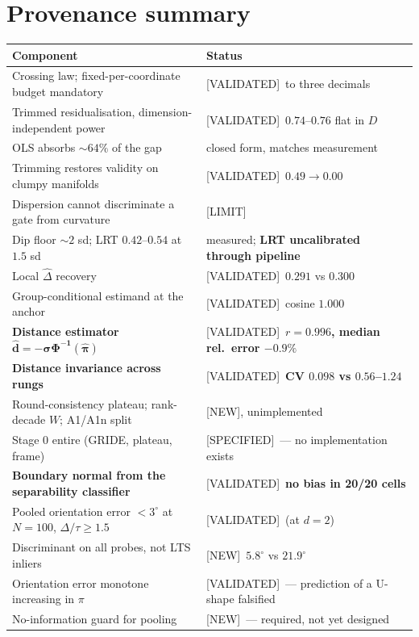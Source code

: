 \documentclass[11pt]{article}
\newcommand{\dhat}{\hat{d}}
\newcommand{\pihat}{\hat{\pi}}
\newcommand{\Dhat}{\hat{\Delta}}
\newcommand{\provtag}[2]{{\footnotesize\sffamily\textcolor{#1}{[#2]}}}
\newcommand{\VALID}{\provtag{okgreen}{VALIDATED}}
\newcommand{\SPEC}{\provtag{specblue}{SPECIFIED}}
\newcommand{\NEWT}{\provtag{newmag}{NEW}}
\newcommand{\LIMIT}{\provtag{limred}{LIMIT}}
\begin{document}
\section{Provenance summary}
\label{sec:provenance}

\begin{table}[h]
\small
\begin{tabular}{@{}p{}p{}@{}}
\toprule
\textbf{\sffamily Component} & \textbf{\sffamily Status}\\
\midrule
Crossing law; fixed-per-coordinate budget mandatory & \VALID\ to three decimals\\
Trimmed residualisation, dimension-independent power & \VALID\ $0.74$--$0.76$ flat in $D$\\
OLS absorbs ${\sim}64\%$ of the gap & closed form, matches measurement\\
Trimming restores validity on clumpy manifolds & \VALID\ $0.49 \to 0.00$\\
Dispersion cannot discriminate a gate from curvature & \LIMIT\\
Dip floor ${\sim}2$ sd; LRT $0.42$--$0.54$ at $1.5$ sd
  & measured; \textbf{LRT uncalibrated through pipeline}\\
Local $\Dhat$ recovery & \VALID\ $0.291$ vs $0.300$\\
Group-conditional estimand at the anchor & \VALID\ cosine $1.000$\\
\textbf{Distance estimator} $\bm{\dhat = -\sigma\Phi^{-1}(\pihat)}$
  & \VALID\ \textbf{$r = 0.996$, median rel.\ error $-0.9\%$}\\
\textbf{Distance invariance across rungs} & \VALID\ \textbf{CV $0.098$ vs $0.56$--$1.24$}\\
Round-consistency plateau; rank-decade $W$; A1/A1n split & \NEWT, unimplemented\\
Stage 0 entire (GRIDE, plateau, frame) & \SPEC\ --- no implementation exists\\
\textbf{Boundary normal from the separability classifier}
  & \VALID\ \textbf{no bias in 20/20 cells}\\
Pooled orientation error $< 3^\circ$ at $N = 100$, $\Delta/\tau \ge 1.5$ & \VALID\ (at $d = 2$)\\
Discriminant on all probes, not LTS inliers & \NEWT\ $5.8^\circ$ vs $21.9^\circ$\\
Orientation error monotone increasing in $\pi$ & \VALID\ --- prediction of a U-shape falsified\\
No-information guard for pooling & \NEWT\ --- required, not yet designed\\

\end{tabular}
\end{table}
\end{document}
